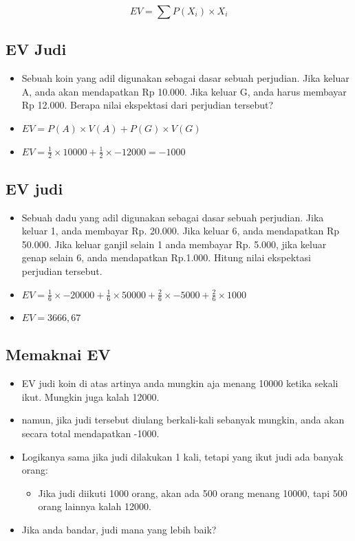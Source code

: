 \documentclass[
  letterpaper,
  DIV=11,
  numbers=noendperiod]{scrartcl}
\providecommand{\tightlist}{%
  \setlength{\itemsep}{0pt}\setlength{\parskip}{0pt}}\usepackage{longtable,booktabs,array}
\begin{document}
\[
EV=\sum P(X_i) \times X_i
\]

\hypertarget{ev-judi}{%
\subsection{EV Judi}\label{ev-judi}}

\begin{itemize}
\item
  Sebuah koin yang adil digunakan sebagai dasar sebuah perjudian. Jika
  keluar A, anda akan mendapatkan Rp 10.000. Jika keluar G, anda harus
  membayar Rp 12.000. Berapa nilai ekspektasi dari perjudian tersebut?
\item
  \(EV=P(A) \times V(A) + P(G) \times V(G)\)
\item
  \(EV=\frac{1}{2} \times 10000 + \frac{1}{2} \times -12000=-1000\)
\end{itemize}

\hypertarget{ev-judi-1}{%
\subsection{EV judi}\label{ev-judi-1}}

\begin{itemize}
\item
  Sebuah dadu yang adil digunakan sebagai dasar sebuah perjudian. Jika
  keluar 1, anda membayar Rp. 20.000. Jika keluar 6, anda mendapatkan Rp
  50.000. Jika keluar ganjil selain 1 anda membayar Rp. 5.000, jika
  keluar genap selain 6, anda mendapatkan Rp.1.000. Hitung nilai
  ekspektasi perjudian tersebut.
\item
  \(EV=\frac{1}{6} \times -20000 + \frac{1}{6} \times 50000 + \frac{2}{6} \times -5000 + \frac{2}{6}\times 1000\)
\item
  \(EV=3666,67\)
\end{itemize}

\hypertarget{memaknai-ev}{%
\subsection{Memaknai EV}\label{memaknai-ev}}

\begin{itemize}
\item
  EV judi koin di atas artinya anda mungkin aja menang 10000 ketika
  sekali ikut. Mungkin juga kalah 12000.
\item
  namun, jika judi tersebut diulang berkali-kali sebanyak mungkin, anda
  akan secara total mendapatkan -1000.
\item
  Logikanya sama jika judi dilakukan 1 kali, tetapi yang ikut judi ada
  banyak orang:

  \begin{itemize}
  \tightlist
  \item
    Jika judi diikuti 1000 orang, akan ada 500 orang menang 10000, tapi
    500 orang lainnya kalah 12000.
  \end{itemize}
\item
  Jika anda bandar, judi mana yang lebih baik?
\end{itemize}
\end{document}
